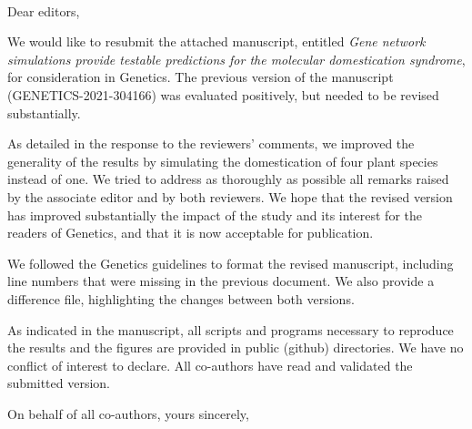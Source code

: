 \documentclass[12pt]{lettre}
\begin{document}

\begin{letter}{~}

\nodate
\nolieu

\def\concname{Subject:~}

\opening{Dear editors, }

We would like to resubmit the attached manuscript, entitled \emph{Gene network simulations provide testable predictions for the
molecular domestication syndrome}, for consideration in Genetics. The previous version of the manuscript (GENETICS-2021-304166) was evaluated positively, but needed to be revised substantially. 

As detailed in the response to the reviewers' comments, we improved the generality of the results by simulating the domestication of four plant species instead of one. We tried to address as thoroughly as possible all remarks raised by the associate editor and by both reviewers. We hope that the revised version has improved substantially the impact of the study and its interest for the readers of Genetics, and that it is now acceptable for publication. 

We followed the Genetics guidelines to format the revised manuscript, including line numbers that were missing in the previous document. We also provide a difference file, highlighting the changes between both versions. 

As indicated in the manuscript, all scripts and programs necessary to reproduce the results and the figures are provided in public (github) directories. We have no conflict of interest to declare. All co-authors have read and validated the submitted version. 

\closing{On behalf of all co-authors, yours sincerely,}

\end{letter}
\end{document}
